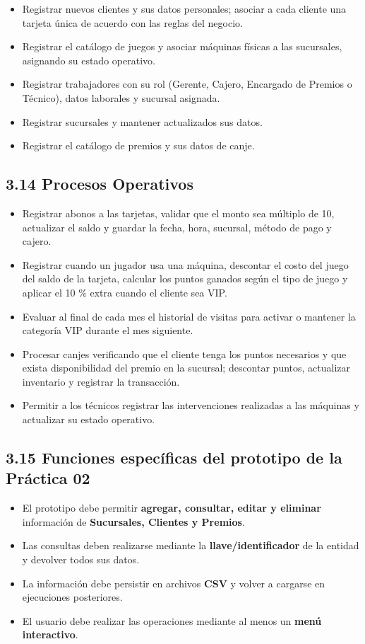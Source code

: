 \documentclass[12pt,a4paper]{article}
\begin{document}
\begin{itemize}
    \item Registrar nuevos clientes y sus datos personales; asociar a cada cliente una tarjeta única de acuerdo con las reglas del negocio.
    \item Registrar el catálogo de juegos y asociar máquinas físicas a las sucursales, asignando su estado operativo.
    \item Registrar trabajadores con su rol (Gerente, Cajero, Encargado de Premios o Técnico), datos laborales y sucursal asignada.
    \item Registrar sucursales y mantener actualizados sus datos.
    \item Registrar el catálogo de premios y sus datos de canje.
\end{itemize}

\subsection*{3.14 Procesos Operativos}

\begin{itemize}
    \item Registrar abonos a las tarjetas, validar que el monto sea múltiplo de 10, actualizar el saldo y guardar la fecha, hora, sucursal, método de pago y cajero.
    \item Registrar cuando un jugador usa una máquina, descontar el costo del juego del saldo de la tarjeta, calcular los puntos ganados según el tipo de juego y aplicar el 10 \% extra cuando el cliente sea VIP.
    \item Evaluar al final de cada mes el historial de visitas para activar o mantener la categoría VIP durante el mes siguiente.
    \item Procesar canjes verificando que el cliente tenga los puntos necesarios y que exista disponibilidad del premio en la sucursal; descontar puntos, actualizar inventario y registrar la transacción.
    \item Permitir a los técnicos registrar las intervenciones realizadas a las máquinas y actualizar su estado operativo.
\end{itemize}

\subsection*{3.15 Funciones específicas del prototipo de la Práctica 02}

\begin{itemize}
    \item El prototipo debe permitir \textbf{agregar, consultar, editar y eliminar} información de \textbf{Sucursales, Clientes y Premios}.
    \item Las consultas deben realizarse mediante la \textbf{llave/identificador} de la entidad y devolver todos sus datos.
    \item La información debe persistir en archivos \textbf{CSV} y volver a cargarse en ejecuciones posteriores.
    \item El usuario debe realizar las operaciones mediante al menos un \textbf{menú interactivo}.
\end{itemize}
\end{document}
